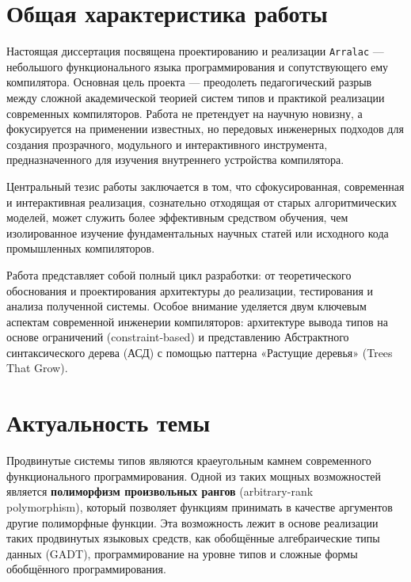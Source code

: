 
\chapter{Общая характеристика работы}

Настоящая диссертация посвящена проектированию и реализации \texttt{Arralac} — небольшого функционального языка программирования и сопутствующего ему компилятора. Основная цель проекта — преодолеть педагогический разрыв между сложной академической теорией систем типов и практикой реализации современных компиляторов. Работа не претендует на научную новизну, а фокусируется на применении известных, но передовых инженерных подходов для создания прозрачного, модульного и интерактивного инструмента, предназначенного для изучения внутреннего устройства компилятора.

Центральный тезис работы заключается в том, что сфокусированная, современная и интерактивная реализация, сознательно отходящая от старых алгоритмических моделей, может служить более эффективным средством обучения, чем изолированное изучение фундаментальных научных статей или исходного кода промышленных компиляторов.

Работа представляет собой полный цикл разработки: от теоретического обоснования и проектирования архитектуры до реализации, тестирования и анализа полученной системы. Особое внимание уделяется двум ключевым аспектам современной инженерии компиляторов: архитектуре вывода типов на основе ограничений (constraint-based) и представлению Абстрактного синтаксического дерева (АСД) с помощью паттерна «Растущие деревья» (Trees That Grow).

\chapter{Актуальность темы}

Продвинутые системы типов являются краеугольным камнем современного функционального программирования. Одной из таких мощных возможностей является \textbf{полиморфизм произвольных рангов} (arbitrary-rank \\ polymorphism), который позволяет функциям принимать в качестве аргументов другие полиморфные функции. Эта возможность лежит в основе реализации таких продвинутых языковых средств, как обобщённые алгебраические типы данных (GADT), программирование на уровне типов и сложные формы обобщённого программирования.

